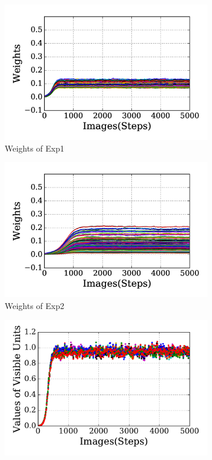\begin{figure}
	\centering
	\begin{subfigure}[t]{0.45\textwidth}
		\includegraphics[width=\textwidth]{pics_sdlm/21_exp_AE_noise/exp1_weights_s.png}
		\caption{Weights of Exp1}
	\end{subfigure}
	\begin{subfigure}[t]{0.45\textwidth}
		\includegraphics[width=\textwidth]{pics_sdlm/21_exp_AE_noise/exp2_weights_s.png}
		\caption{Weights of Exp2}
	\end{subfigure}
	\begin{subfigure}[t]{0.45\textwidth}
		\includegraphics[width=\textwidth]{pics_sdlm/21_exp_AE_noise/exp1_recon_s.pdf}

\end{subfigure}
\end{figure}
